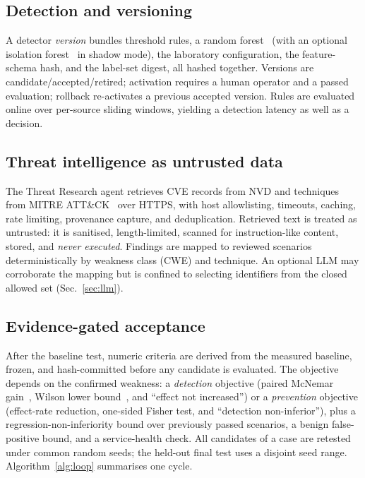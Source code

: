 \documentclass[journal]{IEEEtran}
\begin{document}
\subsection{Detection and versioning}
A detector \emph{version} bundles threshold rules, a random forest~\cite{breiman2001random} (with an
optional isolation forest~\cite{liu2008isolation} in shadow mode), the laboratory configuration, the
feature-schema hash, and the label-set digest, all hashed together. Versions are
candidate/accepted/retired; activation requires a human operator and a passed evaluation; rollback
re-activates a previous accepted version. Rules are evaluated online over per-source sliding windows,
yielding a detection latency as well as a decision.

\subsection{Threat intelligence as untrusted data}
\label{sec:intel}
The Threat Research agent retrieves CVE records from NVD and techniques from MITRE
ATT\&CK~\cite{strom2018attack} over HTTPS, with host allowlisting, timeouts, caching, rate limiting,
provenance capture, and deduplication. Retrieved text is treated as untrusted: it is sanitised,
length-limited, scanned for instruction-like content, stored, and \emph{never executed}. Findings are
mapped to reviewed scenarios deterministically by weakness class (CWE) and technique. An optional
LLM may corroborate the mapping but is confined to selecting identifiers from the closed allowed set
(Sec.~\ref{sec:llm}).

\subsection{Evidence-gated acceptance}
\label{sec:accept}
After the baseline test, numeric criteria are derived from the measured baseline, frozen, and
hash-committed before any candidate is evaluated. The objective depends on the confirmed weakness:
a \emph{detection} objective (paired McNemar gain~\cite{dietterich1998tests}, Wilson lower
bound~\cite{wilson1927interval}, and ``effect not increased'') or a \emph{prevention} objective
(effect-rate reduction, one-sided Fisher test, and ``detection non-inferior''), plus a
regression-non-inferiority bound over previously passed scenarios, a benign false-positive bound, and
a service-health check. All candidates of a case are retested under common random seeds; the held-out
final test uses a disjoint seed range. Algorithm~\ref{alg:loop} summarises one cycle.
\end{document}
